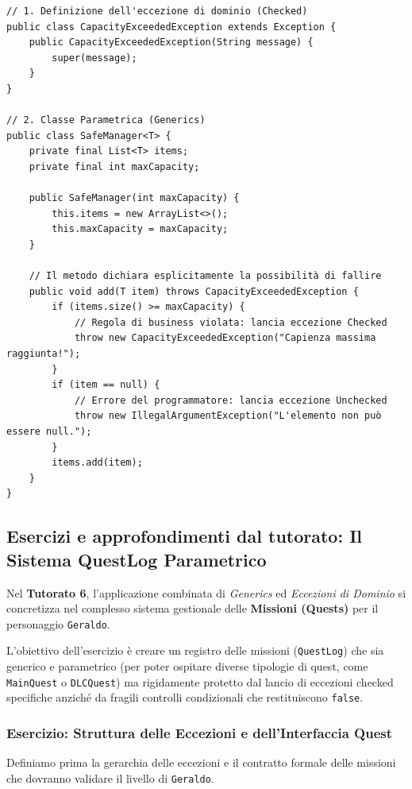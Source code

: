 \documentclass[12pt, a4paper]{article}
\begin{document}
\begin{verbatim}
// 1. Definizione dell'eccezione di dominio (Checked)
public class CapacityExceededException extends Exception {
    public CapacityExceededException(String message) {
        super(message);
    }
}

// 2. Classe Parametrica (Generics)
public class SafeManager<T> {
    private final List<T> items;
    private final int maxCapacity;

    public SafeManager(int maxCapacity) {
        this.items = new ArrayList<>();
        this.maxCapacity = maxCapacity;
    }

    // Il metodo dichiara esplicitamente la possibilità di fallire
    public void add(T item) throws CapacityExceededException {
        if (items.size() >= maxCapacity) {
            // Regola di business violata: lancia eccezione Checked
            throw new CapacityExceededException("Capienza massima raggiunta!");
        }
        if (item == null) {
            // Errore del programmatore: lancia eccezione Unchecked
            throw new IllegalArgumentException("L'elemento non può essere null.");
        }
        items.add(item);
    }
}
\end{verbatim}
\subsection{Esercizi e approfondimenti dal tutorato: Il Sistema QuestLog Parametrico}
Nel \textbf{Tutorato 6}, l'applicazione combinata di \textit{Generics} ed \textit{Eccezioni di Dominio} si concretizza nel complesso sistema gestionale delle \textbf{Missioni (Quests)} per il personaggio \texttt{Geraldo}. 

L'obiettivo dell'esercizio è creare un registro delle missioni (\texttt{QuestLog}) che sia generico e parametrico (per poter ospitare diverse tipologie di quest, come \texttt{MainQuest} o \texttt{DLCQuest}) ma rigidamente protetto dal lancio di eccezioni checked specifiche anziché da fragili controlli condizionali che restituiscono \texttt{false}.

\subsubsection{Esercizio: Struttura delle Eccezioni e dell'Interfaccia Quest}
Definiamo prima la gerarchia delle eccezioni e il contratto formale delle missioni che dovranno validare il livello di \texttt{Geraldo}.

\newpage
\end{document}
